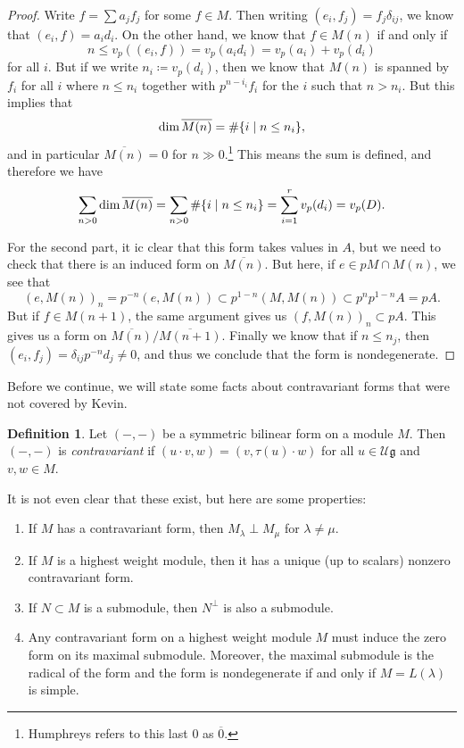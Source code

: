 \documentclass[leqno, openany]{memoir}
\theoremstyle{definition}
\newtheorem{defn}[thm]{Definition}
\theoremstyle{remark}
\theoremstyle{plain}
\theoremstyle{definition}
\theoremstyle{remark}
\newcommand{\U}{\mathcal{U}}
\newcommand{\g}{\mathfrak{g}}
\newcommand{\ol}[1]{\overline{#1}}
\begin{document}
\begin{proof}
  Write $f = \sum a_j f_j$ for some $f \in M$. Then writing $(e_i, f_j) = f_j \delta_{ij}$, we know that $(e_i, f) = a_i d_i$. On the other hand, we know that $f \in M(n)$ if and only if
  \[ n \leq v_p((e_i, f)) = v_p(a_i d_i) = v_p(a_i) + v_p(d_i) \]
  for all $i$. But if we write $n_i \coloneqq v_p(d_i)$, then we know that $M(n)$ is spanned by $f_i$ for all $i$ where $n \leq n_i$ together with $p^{n-i_i} f_i$ for the $i$ such that $n > n_i$. But this implies that
  \[ \dim \ol{M(n)} = \# \qty{i \mid n \leq n_i}, \]
  and in particular $\ol{M(n)} = 0$ for $n \gg 0$.\footnote{Humphreys refers to this last $0$ as $\ol{0}$.} This means the sum is defined, and therefore we have
  \[ \sum_{n>0} \dim \ol{M(n)} = \sum_{n > 0} \# \qty{i \mid n \leq n_i} = \sum_{i=1}^r v_p(d_i) = v_p(D). \]

  For the second part, it ic clear that this form takes values in $A$, but we need to check that there is an induced form on $\ol{M(n)}$. But here, if $e \in pM \cap M(n)$, we see that
  \[ (e, M(n))_n = p^{-n}(e, M(n)) \subset p^{1-n} (M, M(n)) \subset p^n p^{1-n} A = pA. \]
  But if $f \in M(n+1)$, the same argument gives us $(f, M(n))_n \subset pA$. This gives us a form on $\ol{M(n)} / \ol{M(n+1)}$. Finally we know that if $n \leq n_j$, then $(e_i, f_j) = \delta_{ij} p^{-n} d_j \neq 0$, and thus we conclude that the form is nondegenerate.
\end{proof}

Before we continue, we will state some facts about contravariant forms that were not covered by Kevin.

\begin{defn}
  Let $(-,-)$ be a symmetric bilinear form on a module $M$. Then $(-,-)$ is \textit{contravariant} if $(u \cdot v, w) = (v, \tau(u) \cdot w)$ for all $u \in \U \g$ and $v, w \in M$.
\end{defn}
It is not even clear that these exist, but here are some properties:
\begin{enumerate}
  \item If $M$ has a contravariant form, then $M_{\lambda} \perp M_{\mu}$ for $\lambda \neq \mu$.
  \item If $M$ is a highest weight module, then it has a unique (up to scalars) nonzero contravariant form.
  \item If $N \subset M$ is a submodule, then $N^{\perp}$ is also a submodule.
  \item Any contravariant form on a highest weight module $M$ must induce the zero form on its maximal submodule. Moreover, the maximal submodule is the radical of the form and the form is nondegenerate if and only if $M = L(\lambda)$ is simple.
\end{enumerate}
\end{document}
